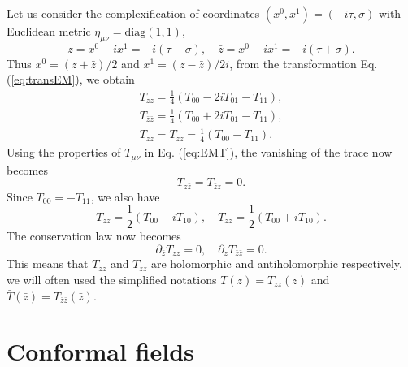 \documentclass[graybox,envcountchap,sectrefs]{svmono}
\begin{document}
Let us consider the complexification of coordinates $(x^0,x^1)=(-i\tau,\sigma)$ with Euclidean metric $\eta_{\mu\nu}=\mathrm{diag}(1,1)$,
\begin{equation}
z=x^{0}+ix^1=-i(\tau-\sigma),\quad \bar{z}=x^{0}-ix^1=-i(\tau+\sigma).
\end{equation}
Thus $x^{0}=(z+\bar{z})/2$ and $x^{1}=(z-\bar{z})/2i$, from the transformation Eq. (\ref{eq:transEM}), we obtain
\begin{align}
T_{zz}= \frac{1}{4}(T_{00}-2iT_{01}-T_{11}),\\
T_{\bar{z}\bar{z}}=\frac{1}{4}(T_{00}+2iT_{01}-T_{11}), \\
T_{z\bar{z}}=T_{\bar{z}z}= \frac{1}{4}(T_{00}+T_{11}).
\end{align}
Using the properties of $T_{\mu\nu}$ in Eq. (\ref{eq:EMT}), the vanishing of the trace now becomes
\begin{equation}
	\boxed{T_{z\bar{z}}=T_{\bar{z}z}=0.}
\end{equation}
Since $T_{00}=-T_{11}$, we also have 
\begin{equation}
T_{zz}=\frac{1}{2}(T_{00}-iT_{10}),\quad T_{\bar{z}\bar{z}}=\frac{1}{2}(T_{00}+iT_{10}).
\end{equation}
The conservation law now becomes
\begin{equation}
\boxed{\partial_{\bar{z}}T_{zz}=0,\quad 	\partial_z T_{\bar{z}\bar{z}}=0.}
\end{equation}
This means that $T_{zz}$ and $T_{\bar{z}\bar{z}}$ are holomorphic and antiholomorphic respectively, we will often used the simplified notations $T(z)=T_{zz}(z)$ and $\bar{T}(\bar{z})=T_{\bar{z}\bar{z}}(\bar{z})$.

\section{Conformal fields}
\end{document}
